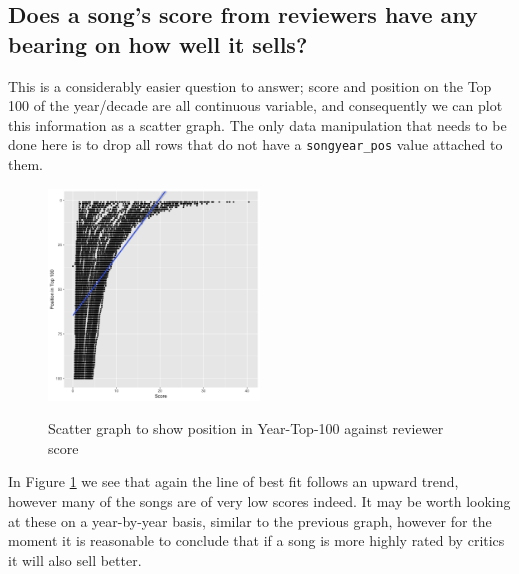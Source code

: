 \documentclass[12pt]{article}
\newcommand{\myfig}{\begin{figure}}
\begin{document}
  \subsection{Does a song's score from reviewers have any bearing on how well it sells?}
        This is a considerably easier question to answer; score and position on the Top 100 of the year/decade are all continuous variable, and consequently we can plot this information as a scatter graph.
        The only data manipulation that needs to be done here is to drop all rows that do not have a \verb|songyear_pos| value attached to them.

        \myfig
          \caption{Scatter graph to show position in Year-Top-100 against reviewer score}
          \includegraphics[width=0.5\textwidth]{scoreSell}
          \label{fig:q2}
\end{figure}
        In Figure \ref{fig:q2} we see that again the line of best fit follows an upward trend, however many of the songs are of very low scores indeed.
        It may be worth looking at these on a year-by-year basis, similar to the previous graph, however for the moment it is reasonable to conclude that if a song is more highly rated by critics it will also sell better.
\end{document}
